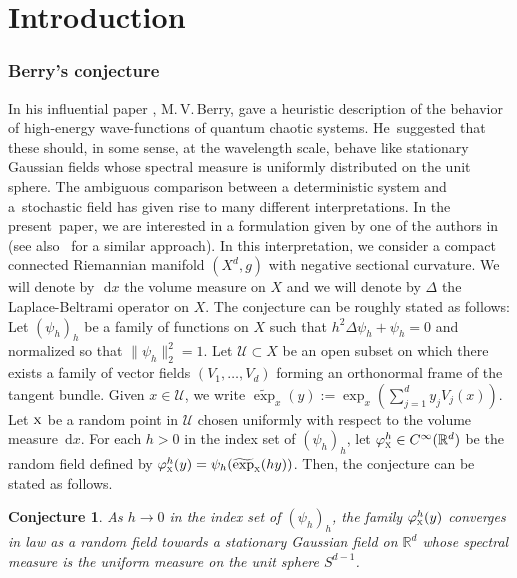 \documentclass[JEP,XML,SOM,Unicode,published]{cedram}
\let\mathcal\mathscr
\newcommand{\rd}{\,\mathrm{d}}
\theoremstyle{plain}
\newtheorem*{conjecture}{Conjecture}
\theoremstyle{definition}
\newcommand{\R}{\mathbb{R}}
\begin{document}
\maketitle
\vspace*{-\baselineskip}\enlargethispage{.5\baselineskip}
\tableofcontents
\mainmatter

\section{Introduction}

\subsubsection*{Berry's conjecture}

In his influential paper \cite{Ber}, M.\,V.\,Berry, gave a heuristic descrip\-tion of the behavior of high-energy wave-functions of quantum chaotic systems. He~suggested that these should, in some sense, at the wavelength scale, behave like stationary Gaussian fields whose spectral measure is uniformly distributed on the unit sphere. The ambiguous comparison between a deterministic system and a~stochastic field has given rise to many different interpretations. In the present~paper, we are interested in a formulation given by one of the authors in \cite{LWL} (see also~\cite{ABLM} for a similar approach). In this interpretation, we consider a compact connected Riemannian manifold $(X^d,g)$ with negative sectional curvature. We will denote by~$\rd x$ the volume measure on $X$ and we will denote by $\Delta$ the Laplace-Beltrami operator on $X$. The conjecture can be roughly stated as follows: Let $(\psi_h)_h$ be a family of functions on $X$ such that $h^2\Delta\psi_h+\psi_h=0$ and normalized so that $\|\psi_h\|_2^2=1$. Let $\mathcal{U}\subset X$ be an open subset on which there exists a family of vector fields $(V_1,\dots,V_d)$ forming an orthonormal frame of the tangent bundle. Given $x\in \mathcal{U}$, we write $\widetilde{\exp}_x(y):=\exp_x(\sum_{j=1}^d y_jV_j(x))$. Let $\textsc{x}$ be a random point in $\mathcal{U}$ chosen uniformly with respect to the volume measure $\rd x$. For each $h>0$ in the index set of $(\psi_h)_h$, let $\varphi_{\textsc{x}}^h\in C^\infty(\R^d)$ be the random field defined by $\varphi_{\textsc{x}}^h(y)=\psi_h(\widetilde{\exp}_{\textsc{x}}(hy))$. Then, the conjecture can be stated as follows.\enlargethispage{.5\baselineskip}%

\begin{conjecture}
As $h\to 0$ in the index set of $(\psi_h)_h$, the family $\varphi_{\textsc{x}}^h(y)$ converges in law as a random field towards a stationary Gaussian field on $\R^d$ whose spectral measure is the uniform measure on the unit sphere $S^{d-1}$.
\end{conjecture}
\end{document}
